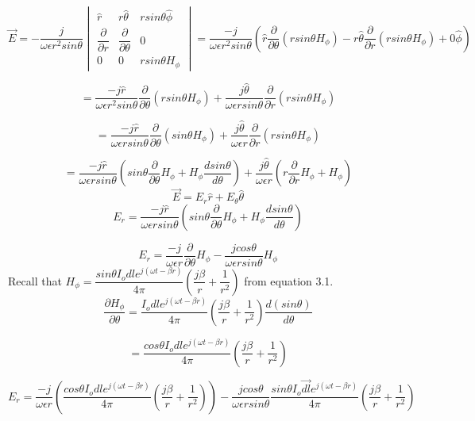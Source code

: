 \begin{dmath*}
\vec{E}  = -\dfrac{j}{\omega \epsilon r^2sin\theta}
\begin{vmatrix}
\hat{r} & r\hat{\theta} & rsin\theta\hat{\phi} \\ 
\dfrac{\partial}{\partial r} & \dfrac{\partial}{\partial \theta} &  0 \\
0 & 0 & rsin\theta H_\phi              
\end{vmatrix}  = \dfrac{-j}{\omega  \epsilon r^2 sin\theta}\left(\hat{r} \dfrac{\partial}{\partial \theta}\left(rsin \theta H_{\phi}\right) - r\hat{\theta} \dfrac{\partial}{\partial r}(rsin\theta H_{\phi}) + 0\hat{\phi}\right)
\end{dmath*}

$$ = \dfrac{-j \hat{r}}{\omega \epsilon r^2 sin\theta}\dfrac{\partial}{\partial \theta}(rsin\theta H_{\phi}) + \dfrac{j \hat{\theta}}{\omega  \epsilon r sin\theta}\dfrac{\partial}{\partial r}(rsin\theta H_{\phi})$$ 

$$ = \dfrac{-j \hat{r}}{\omega  \epsilon r sin\theta}\dfrac{\partial}{\partial \theta}(sin\theta H_{\phi}) + \dfrac{j \hat{\theta}}{\omega  \epsilon r}\dfrac{\partial}{\partial r}(rsin\theta H_{\phi}) $$

$$ = \dfrac{-j \hat{r}}{\omega \epsilon r sin\theta}\left(sin\theta\dfrac{\partial }{\partial \theta}H_{\phi} + H_{\phi}\dfrac{d sin\theta}{d\theta}\right) + \dfrac{j\hat{\theta}}{\omega \epsilon r}\left(r\dfrac{\partial}{\partial r}H_{\phi} + H_{\phi}\right)$$
\smallskip
$$\vec{E} = E_r\hat{r} + E_{\theta}\hat{\theta}$$
\smallskip
$$E_r = \dfrac{-j \hat{r}}{\omega \epsilon r sin\theta}\left(sin\theta\dfrac{\partial }{\partial \theta}H_{\phi} + H_{\phi}\dfrac{d sin\theta}{d\theta}\right)$$

$$E_r = \dfrac{-j}{\omega \epsilon r}\dfrac{\partial}{\partial \theta}H_{\phi} - \dfrac{j cos\theta}{\omega \epsilon rsin\theta}H_\phi$$
\smallskip
Recall that $H_{\phi} = \dfrac{sin\theta I_o dl e^{j(\omega t-\beta r)} }{4\pi} \left(\dfrac{j\beta}{r} + \dfrac{1}{r^2}\right)$ from equation 3.1.
\smallskip
$$\dfrac{\partial H_{\phi}}{\partial \theta} =  \dfrac{I_o dl e^{j(\omega t-\beta r)} }{4\pi} (\dfrac{j\beta}{r} + \dfrac{1}{r^2})\dfrac{d (sin\theta)}{d \theta}$$

$$ = \dfrac{cos \theta I_o dl e^{j(\omega t-\beta r)} }{4\pi} \left(\dfrac{j\beta}{r} + \dfrac{1}{r^2}\right)$$
 
\begin{dmath*}
	E_r =  \dfrac{-j}{\omega \epsilon r}\left(\dfrac{cos \theta I_o dl e^{j(\omega t-\beta r)} }{4\pi} \left(\dfrac{j\beta}{r} + \dfrac{1}{r^2}\right)\right) -  \dfrac{j cos\theta}{\omega \epsilon rsin\theta}\dfrac{sin\theta I_o\vec{dl} e^{j(\omega t-\beta r)} }{4\pi} \left(\dfrac{j\beta}{r} + \dfrac{1}{r^2}\right)
\end{dmath*}

